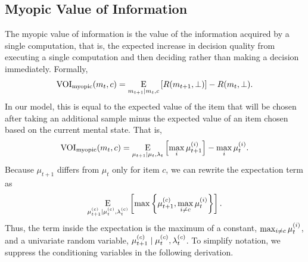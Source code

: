 \subsection{Myopic Value of Information}
The myopic value of information is the value of the information acquired by a single computation, that is, the expected increase in decision quality from executing a single computation and then deciding rather than making a decision immediately. Formally,
%
%
\begin{equation}
  \text{VOI}_\text{myopic}(m_t,c) = \operatorname*{E}_{m_{t+1} \mid m_t, c}\left[
    R(m_{t+1},\bot)
  \right] - R(m_t, \bot).
\end{equation}
%
In our model, this is equal to the expected value of the item that will be chosen after taking an additional sample minus the expected value of an item chosen based on the current mental state. That is,
%
%
\begin{equation}
  \text{VOI}_\text{myopic}(m_t, c) = \operatorname*{E}_{\mu_{t+1} \mid \mu_t, \lambda_t} \left[
    \max_i \mu_{t+1}^{(i)}
\right] - \max_i \mu_t^{(i)}.
\end{equation}
%
Because $\mu_{t+1}$ differs from $\mu_t$ only for item $c$, we can rewrite the expectation term as
%
\begin{equation}
  \label{eq:myopicmax}
  \operatorname*{E}_{\mu_{t+1}^{(c)} \mid \mu_{t}^{(c)}, \lambda_{t}^{(c)}} \left[ 
    \max \left\{ \mu_{t+1}^{(c)},\max_{i \neq c} \mu_t^{(i)} \right\} 
  \right].
\end{equation}
%
Thus, the term inside the expectation is the maximum of a constant, $\max_{i \neq c} \mu_t^{(i)}$, and a univariate random variable, $\mu_{t+1}^{(c)} \mid \mu_{t}^{(c)}, \lambda_{t}^{(c)}$. To simplify notation, we suppress the conditioning variables in the following derivation.


